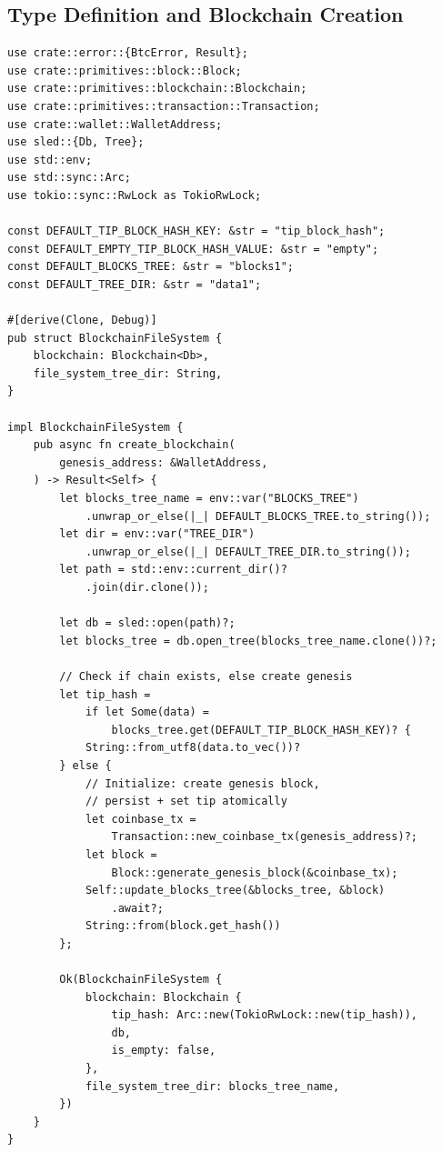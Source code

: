 \subsection{Type Definition and Blockchain Creation}
\label{sec:ch11-type-def}

\begin{listing}[H]
\caption{Type definition and blockchain creation}
\label{lst:ch11-create}
\begin{verbatim}
use crate::error::{BtcError, Result};
use crate::primitives::block::Block;
use crate::primitives::blockchain::Blockchain;
use crate::primitives::transaction::Transaction;
use crate::wallet::WalletAddress;
use sled::{Db, Tree};
use std::env;
use std::sync::Arc;
use tokio::sync::RwLock as TokioRwLock;

const DEFAULT_TIP_BLOCK_HASH_KEY: &str = "tip_block_hash";
const DEFAULT_EMPTY_TIP_BLOCK_HASH_VALUE: &str = "empty";
const DEFAULT_BLOCKS_TREE: &str = "blocks1";
const DEFAULT_TREE_DIR: &str = "data1";

#[derive(Clone, Debug)]
pub struct BlockchainFileSystem {
    blockchain: Blockchain<Db>,
    file_system_tree_dir: String,
}

impl BlockchainFileSystem {
    pub async fn create_blockchain(
        genesis_address: &WalletAddress,
    ) -> Result<Self> {
        let blocks_tree_name = env::var("BLOCKS_TREE")
            .unwrap_or_else(|_| DEFAULT_BLOCKS_TREE.to_string());
        let dir = env::var("TREE_DIR")
            .unwrap_or_else(|_| DEFAULT_TREE_DIR.to_string());
        let path = std::env::current_dir()?
            .join(dir.clone());

        let db = sled::open(path)?;
        let blocks_tree = db.open_tree(blocks_tree_name.clone())?;

        // Check if chain exists, else create genesis
        let tip_hash =
            if let Some(data) =
                blocks_tree.get(DEFAULT_TIP_BLOCK_HASH_KEY)? {
            String::from_utf8(data.to_vec())?
        } else {
            // Initialize: create genesis block,
            // persist + set tip atomically
            let coinbase_tx =
                Transaction::new_coinbase_tx(genesis_address)?;
            let block =
                Block::generate_genesis_block(&coinbase_tx);
            Self::update_blocks_tree(&blocks_tree, &block)
                .await?;
            String::from(block.get_hash())
        };

        Ok(BlockchainFileSystem {
            blockchain: Blockchain {
                tip_hash: Arc::new(TokioRwLock::new(tip_hash)),
                db,
                is_empty: false,
            },
            file_system_tree_dir: blocks_tree_name,
        })
    }
}
\end{verbatim}
\end{listing}

